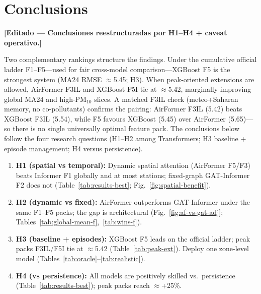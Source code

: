 \documentclass[11pt]{article}
\newcommand{\revnew}[1]{\textcolor{orange!75!black}{#1}}
\begin{document}
\section{Conclusions}
\label{sec:conclusions}

\revnew{\textbf{[Editado --- Conclusiones reestructuradas por H1--H4 + caveat operativo.]}}\par
Two complementary rankings structure the findings. Under the cumulative official ladder F1--F5---used for fair cross-model comparison---XGBoost F5 is the strongest system (MA24 RMSE $\approx$5.45; H3). When peak-oriented extensions are allowed, AirFormer F3IL and XGBoost F5I tie at $\approx$5.42, marginally improving global MA24 and high-PM$_{10}$ slices. A matched F3IL check (meteo+Saharan memory, no co-pollutants) confirms the pairing: AirFormer F3IL (5.42) beats XGBoost F3IL (5.54), while F5 favours XGBoost (5.45) over AirFormer (5.65)---so there is no single universally optimal feature pack. The conclusions below follow the four research questions (H1--H2 among Transformers; H3 baseline + episode management; H4 versus persistence).

\revnew{\begin{enumerate}[leftmargin=1.4em,itemsep=0.35em]
  \item \textbf{H1 (spatial vs temporal):} Dynamic spatial attention (AirFormer F5/F3) beats Informer F1 globally and at most stations; fixed-graph GAT-Informer F2 does not (Table~\ref{tab:results-best}; Fig.~\ref{fig:spatial-benefit}).
  \item \textbf{H2 (dynamic vs fixed):} AirFormer outperforms GAT-Informer under the same F1--F5 packs; the gap is architectural (Fig.~\ref{fig:af-vs-gat-adj}; Tables~\ref{tab:global-mean-f},~\ref{tab:wins-f}).
  \item \textbf{H3 (baseline + episodes):} XGBoost F5 leads on the official ladder; peak packs F3IL/F5I tie at $\approx$5.42 (Table~\ref{tab:peak-ext}). Deploy one zone-level model (Tables~\ref{tab:oracle}--\ref{tab:realistic}).
  \item \textbf{H4 (vs persistence):} All models are positively skilled vs.\ persistence (Table~\ref{tab:results-best}); peak packs reach $\approx$+25\%.
\end{enumerate}}
\end{document}
